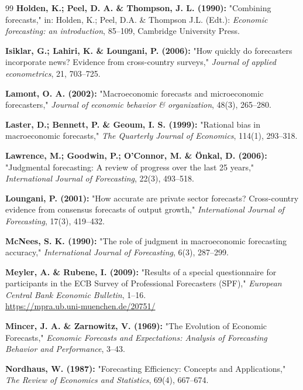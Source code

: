 \documentclass[12pt,a4paper]{article}
\begin{document}
\begin{thebibliography}{99}
	\textbf{Holden, K.; Peel, D. A. \& Thompson, J. L. (1990):}
	"Combining forecasts,"
	in: Holden, K.; Peel, D.A. \& Thompson J.L. (Edt.):
	\emph{Economic forecasting: an introduction}, 85--109, Cambridge University Press.
	
	\textbf{Isiklar, G.; Lahiri, K. \& Loungani, P. (2006):}
	"How quickly do forecasters incorporate news? Evidence from cross-country surveys,"
	\emph{Journal of applied econometrics}, 21, 703--725.
	
	\textbf{Lamont, O. A. (2002):}
	"Macroeconomic forecasts and microeconomic forecasters,"
	\emph{Journal of economic behavior \& organization}, 48(3), 265--280.
	
	\textbf{Laster, D.; Bennett, P. \& Geoum, I. S. (1999):}
	"Rational bias in macroeconomic forecasts,"
	\emph{The Quarterly Journal of Economics}, 114(1), 293--318.
	
	\textbf{Lawrence, M.; Goodwin, P.; O'Connor, M. \& Önkal, D. (2006):}
	"Judgmental forecasting: A review of progress over the last 25 years,"
	\emph{International Journal of Forecasting}, 22(3), 493--518.
	
	\textbf{Loungani, P. (2001):}
	"How accurate are private sector forecasts? Cross-country evidence from consensus forecasts of output growth,"
	\emph{International Journal of Forecasting}, 17(3), 419--432.
	
	\textbf{McNees, S. K. (1990):}
	"The role of judgment in macroeconomic forecasting accuracy,"
	\emph{International Journal of Forecasting}, 6(3), 287--299.
	
	\textbf{Meyler, A. \& Rubene, I. (2009):}
	"Results of a special questionnaire for participants in the ECB Survey of Professional Forecasters (SPF),"
	\emph{European Central Bank Economic Bulletin}, 1--16.\\
	\url{https://mpra.ub.uni-muenchen.de/20751/}
	
	\textbf{Mincer, J. A. \& Zarnowitz, V. (1969):}
	"The Evolution of Economic Forecasts,"
	\emph{Economic Forecasts and Expectations: Analysis of Forecasting Behavior and Performance}, 3--43.
	
	\textbf{Nordhaus, W. (1987):}
	"Forecasting Efficiency: Concepts and Applications,"
	\emph{The Review of Economics and Statistics}, 69(4), 667--674.
	

\end{thebibliography}
\end{document}
